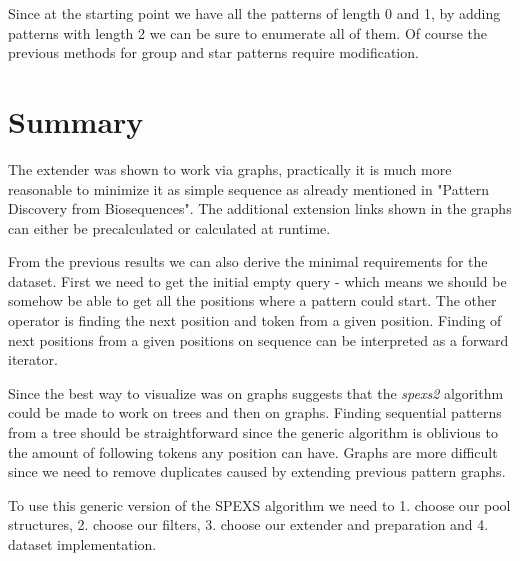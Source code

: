 \begin{figure}[H]
	
\end{figure}

Since at the starting point we have all the patterns of length 0 and 1, by adding patterns with length 2 we can be sure to enumerate all of them. Of course the previous methods for group and star patterns require modification.

\section{Summary}

The extender was shown to work via graphs, practically it is much more reasonable to minimize it as simple sequence as already mentioned in "Pattern Discovery from Biosequences"\cite{spexs}. The additional extension links shown in the graphs can either be precalculated or calculated at runtime.

From the previous results we can also derive the minimal requirements for the dataset. First we need to get the initial empty query - which means we should be somehow be able to get all the positions where a pattern could start. The other operator is finding the next position and token from a given position. Finding of next positions from a given positions on sequence can be interpreted as a forward iterator.

Since the best way to visualize was on graphs suggests that the \emph{spexs2} algorithm could be made to work on trees and then on graphs. Finding sequential patterns from a tree should be straightforward since the generic algorithm is oblivious to the amount of following tokens any position can have. Graphs are more difficult since we need to remove duplicates caused by extending previous pattern graphs\cite{SubgraphIsomorphism}.

To use this generic version of the SPEXS algorithm we need to 1. choose our pool structures, 2. choose our filters, 3. choose our extender and preparation and 4. dataset implementation.
